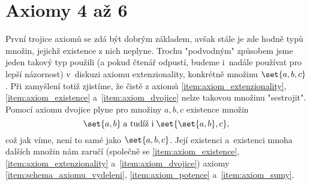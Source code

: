 \section{Axiomy 4 až 6}\label{sec:axiomy_4_az_6}
První trojice axiomů se zdá být dobrým základem, avšak stále je zde hodně typů množin, jejichž existence z nich neplyne. Trochu "podvodným" způsobem jsme jeden takový typ použili (a pokud čtenář odpustí, budeme i~nadále používat pro lepší názornost) v~diskuzi axiomu extenzionality, konkrétně množinu $\set{a,b,c}$. Při zamyšlení totiž zjistíme, že čistě z axiomů \ref{item:axiom_extenzionality}, \ref{item:axiom_existence} a~\ref{item:axiom_dvojice} nelze takovou množinu "sestrojit". Pomocí axiomu dvojice plyne pro množiny $a,b,c$ existence množin
\begin{equation*}
    \set{a,b}\;\text{a tudíž i}\;\set{\set{a,b},c},
\end{equation*}
což jak víme, není to samé jako $\set{a,b,c}$. Její existenci a~existenci mnoha dalších množin nám zaručí (společně se \ref{item:axiom_existence}, \ref{item:axiom_extenzionality} a~\ref{item:axiom_dvojice}) axiomy \ref{item:schema_axiomu_vydeleni}, \ref{item:axiom_potence} a~\ref{item:axiom_sumy}.

